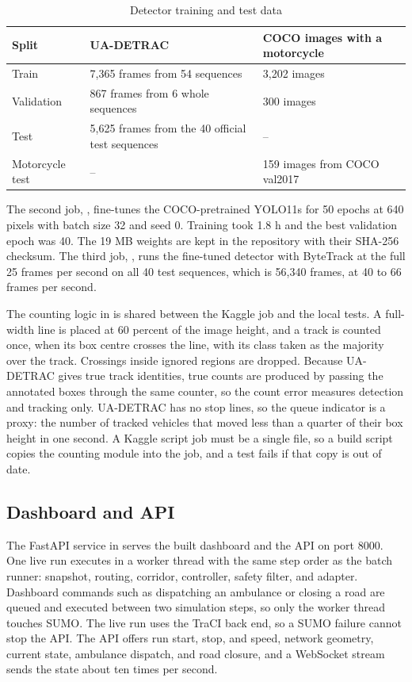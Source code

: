 \begin{table}[htbp]
\centering
\caption{Detector training and test data}
\label{tab:vision-data}
\begin{tabularx}{\textwidth}{p{}YY}
\toprule
\textbf{Split} & \textbf{UA-DETRAC} & \textbf{COCO images with a motorcycle}\\
\midrule
Train & 7,365 frames from 54 sequences & 3,202 images\\
Validation & 867 frames from 6 whole sequences & 300 images\\
Test & 5,625 frames from the 40 official test sequences & --\\
Motorcycle test & -- & 159 images from COCO val2017\\
\bottomrule
\end{tabularx}
\end{table}

The second job, , fine-tunes the COCO-pretrained YOLO11s \cite{ultralytics2024yolo11} for 50 epochs at 640 pixels with batch size 32 and seed 0. Training took 1.8 h and the best validation epoch was 40. The 19 MB weights are kept in the repository with their SHA-256 checksum. The third job, , runs the fine-tuned detector with ByteTrack \cite{zhang2022bytetrack} at the full 25 frames per second on all 40 test sequences, which is 56,340 frames, at 40 to 66 frames per second.

The counting logic in  is shared between the Kaggle job and the local tests. A full-width line is placed at 60 percent of the image height, and a track is counted once, when its box centre crosses the line, with its class taken as the majority over the track. Crossings inside ignored regions are dropped. Because UA-DETRAC gives true track identities, true counts are produced by passing the annotated boxes through the same counter, so the count error measures detection and tracking only. UA-DETRAC has no stop lines, so the queue indicator is a proxy: the number of tracked vehicles that moved less than a quarter of their box height in one second. A Kaggle script job must be a single file, so a build script copies the counting module into the job, and a test fails if that copy is out of date.

\subsection{Dashboard and API}

The FastAPI service in  serves the built dashboard and the API on port 8000. One live run executes in a worker thread with the same step order as the batch runner: snapshot, routing, corridor, controller, safety filter, and adapter. Dashboard commands such as dispatching an ambulance or closing a road are queued and executed between two simulation steps, so only the worker thread touches SUMO. The live run uses the TraCI back end, so a SUMO failure cannot stop the API. The API offers run start, stop, and speed, network geometry, current state, ambulance dispatch, and road closure, and a WebSocket stream sends the state about ten times per second.


